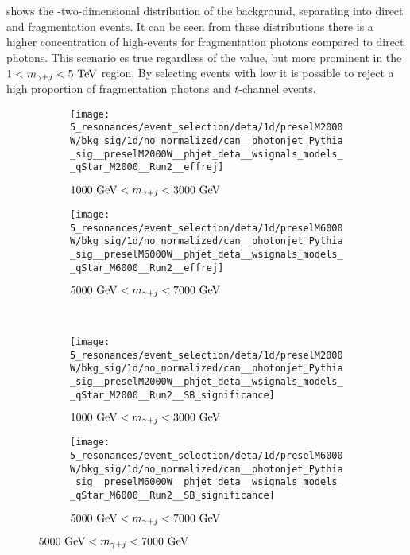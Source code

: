 \Fig{\ref{fig:evt_selection:sr_opt:eta:deta:2d}} shows the \Deta-\myj two-dimensional distribution of the \gammajet background, separating into direct and fragmentation events.
It can be seen from these distributions there is a higher concentration of high-\detayj events for fragmentation photons compared to direct photons. This scenario es true regardless of the \myj value, but more prominent in the \(1 < m_{\gamma+j} < 5~\text{TeV}\) region. By selecting events with low \detayj it is possible to reject a high proportion of fragmentation photons and \(t\)-channel events.

\begin{figure}[ht!]
    \centering
    \begin{subfigure}[h]{0.49\linewidth}
        \centering
        \texttt{[image: 5\_resonances/event\_selection/deta/1d/preselM2000W/bkg\_sig/1d/no\_normalized/can\_\_photonjet\_Pythia\_sig\_\_preselM2000W\_\_phjet\_deta\_\_wsignals\_models\_\_qStar\_M2000\_\_Run2\_\_effrej]}
        \caption{\(1000~\text{GeV} < m_{\gamma+j} < 3000~\text{GeV}\)}
        \label{fig:evt_selection:sr_opt:eta:deta:1d:effrej_2000W}
    \end{subfigure}
    \hfill
    \begin{subfigure}[h]{0.49\linewidth}
        \centering
        \texttt{[image: 5\_resonances/event\_selection/deta/1d/preselM6000W/bkg\_sig/1d/no\_normalized/can\_\_photonjet\_Pythia\_sig\_\_preselM6000W\_\_phjet\_deta\_\_wsignals\_models\_\_qStar\_M6000\_\_Run2\_\_effrej]}
        \caption{\(5000~\text{GeV} < m_{\gamma+j} < 7000~\text{GeV}\)}
        \label{fig:evt_selection:sr_opt:eta:deta:1d:effrej_6000W}
    \end{subfigure}\\
    \begin{subfigure}[h]{0.49\linewidth}
        \centering
        \texttt{[image: 5\_resonances/event\_selection/deta/1d/preselM2000W/bkg\_sig/1d/no\_normalized/can\_\_photonjet\_Pythia\_sig\_\_preselM2000W\_\_phjet\_deta\_\_wsignals\_models\_\_qStar\_M2000\_\_Run2\_\_SB\_significance]}
        \caption{\(1000~\text{GeV} < m_{\gamma+j} < 3000~\text{GeV}\)}
        \label{fig:evt_selection:sr_opt:eta:deta:1d:SB_2000W}
    \end{subfigure}
    \hfill
    \begin{subfigure}[h]{0.49\linewidth}
        \centering
        \texttt{[image: 5\_resonances/event\_selection/deta/1d/preselM6000W/bkg\_sig/1d/no\_normalized/can\_\_photonjet\_Pythia\_sig\_\_preselM6000W\_\_phjet\_deta\_\_wsignals\_models\_\_qStar\_M6000\_\_Run2\_\_SB\_significance]}
        \caption{\(5000~\text{GeV} < m_{\gamma+j} < 7000~\text{GeV}\)}

\end{subfigure}
\end{figure}
